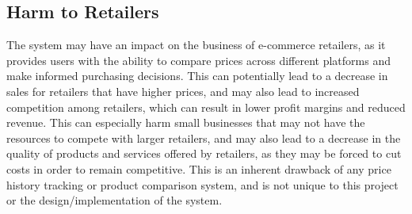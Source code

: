 \subsection{Harm to Retailers}\label{subsec:harm-to-retailers}
The system may have an impact on the business of e-commerce retailers, as it provides users with the ability to compare prices across different platforms and make informed purchasing decisions.
This can potentially lead to a decrease in sales for retailers that have higher prices, and may also lead to increased competition among retailers, which can result in lower profit margins and reduced revenue.
This can especially harm small businesses that may not have the resources to compete with larger retailers, and may also lead to a decrease in the quality of products and services offered by retailers, as they may be forced to cut costs in order to remain competitive.
This is an inherent drawback of any price history tracking or product comparison system, and is not unique to this project or the design/implementation of the system.